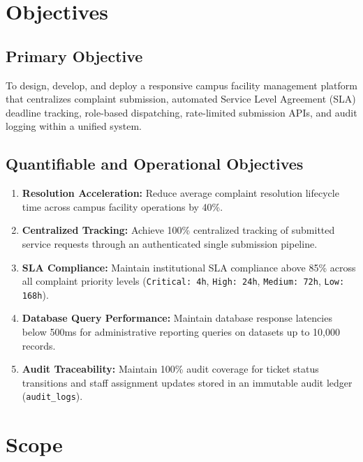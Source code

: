 \documentclass[12pt, a4paper]{article}
\begin{document}
\newpage
\tableofcontents
\newpage

\section{Objectives}

\subsection{Primary Objective}
To design, develop, and deploy a responsive campus facility management platform that centralizes complaint submission, automated Service Level Agreement (SLA) deadline tracking, role-based dispatching, rate-limited submission APIs, and audit logging within a unified system.

\subsection{Quantifiable and Operational Objectives}
\begin{enumerate}
    \item \textbf{Resolution Acceleration:} Reduce average complaint resolution lifecycle time across campus facility operations by 40\%.
    \item \textbf{Centralized Tracking:} Achieve 100\% centralized tracking of submitted service requests through an authenticated single submission pipeline.
    \item \textbf{SLA Compliance:} Maintain institutional SLA compliance above 85\% across all complaint priority levels (\texttt{Critical: 4h}, \texttt{High: 24h}, \texttt{Medium: 72h}, \texttt{Low: 168h}).
    \item \textbf{Database Query Performance:} Maintain database response latencies below 500ms for administrative reporting queries on datasets up to 10,000 records.
    \item \textbf{Audit Traceability:} Maintain 100\% audit coverage for ticket status transitions and staff assignment updates stored in an immutable audit ledger (\texttt{audit\_logs}).
\end{enumerate}

\section{Scope}
\end{document}
